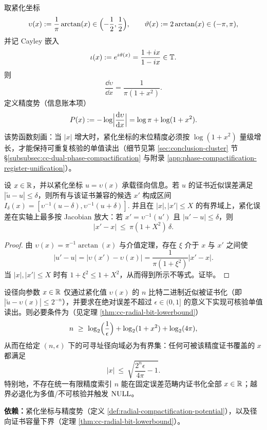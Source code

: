 \begin{definition}\label{def:radial-compactification-potential}
取紧化坐标
$$
\upsilon(x):=\frac{1}{\pi}\arctan(x)\in\Bigl(-\frac12,\frac12\Bigr),
\qquad
\vartheta(x):=2\arctan(x)\in(-\pi,\pi),
$$
并记 Cayley 嵌入
$$
\iota(x):=e^{i\vartheta(x)}=\frac{1+ix}{1-ix}\in\mathbb{T}.
$$
则
$$
\frac{\dd\upsilon}{\dd x}=\frac{1}{\pi(1+x^2)}.
$$
定义精度势（信息账本项）
$$
P(x):=-\log\Bigl|\frac{\mathrm{d}\upsilon}{\mathrm{d} x}\Bigr|=\log\pi+\log(1+x^2).
$$
该势函数刻画：当 $|x|$ 增大时，紧化坐标的末位精度必须按 $\log(1+x^2)$ 量级增长，才能保持可重复核验的单值读出（细节见第 \ref{sec:conclusion-cluster} 节 \S\ref{subsubsec:cc-dual-phase-compactification} 与附录 \ref{app:phase-compactification-register-unification}）。
\end{definition}

\begin{proposition}\label{prop:radial-error-amplification}
设 $x\in\mathbb{R}$，并以紧化坐标 $u=\upsilon(x)$ 承载径向信息。若 $u$ 的证书近似误差满足 $|\tilde u-u|\le\delta$，则所有与该证书兼容的候选 $x'$ 构成区间
$
I_\delta(x)=[\upsilon^{-1}(u-\delta),\upsilon^{-1}(u+\delta)].
$
并且在 $|x|,|x'|\le X$ 的有界域上，紧化误差在实轴上最多按 Jacobian 放大：若 $x'=\upsilon^{-1}(u')$ 且 $|u'-u|\le\delta$，则
$$
|x'-x|\ \le\ \pi(1+X^2)\,\delta.
$$
\end{proposition}

\begin{proof}
由 $\upsilon(x)=\pi^{-1}\arctan(x)$ 与介值定理，存在 $\xi$ 介于 $x$ 与 $x'$ 之间使
$$
|u'-u|=|\upsilon(x')-\upsilon(x)|=\frac{1}{\pi(1+\xi^2)}|x'-x|.
$$
当 $|x|,|x'|\le X$ 时有 $1+\xi^2\le 1+X^2$，从而得到所示不等式。证毕。
\end{proof}

\begin{theorem}[固定精度下的径向可寻址域有界]\label{thm:radial-addressability-bounded}
设径向参数 $x\in\mathbb{R}$ 仅通过紧化值 $\upsilon(x)$ 的 $n$ 比特二进制近似被证书化（即 $|\tilde u-\upsilon(x)|\le 2^{-n}$），并要求在绝对误差不超过 $\epsilon\in(0,1]$ 的意义下实现可核验单值读出。则必要条件为（见定理 \ref{thm:cc-radial-bit-lowerbound}）
$$
n\ \ge\ \log_2\Bigl(\frac{1}{\epsilon}\Bigr)+\log_2(1+x^2)+\log_2(4\pi),
$$
从而在给定 $(n,\epsilon)$ 下的可寻址径向域必为有界集：任何可被该精度证书覆盖的 $x$ 都满足
$$
|x|\ \le\ \sqrt{\frac{2^{n}\epsilon}{4\pi}-1}.
$$
特别地，不存在统一有限精度索引 $n$ 能在固定误差范畴内证书化全部 $x\in\mathbb{R}$；越界必退化为多值/不可核验并触发 $\mathrm{NULL}$。
\par\noindent\textnormal{\textbf{依赖：}紧化坐标与精度势（定义 \ref{def:radial-compactification-potential}），以及径向证书容量下界（定理 \ref{thm:cc-radial-bit-lowerbound}）。}
\end{theorem}

